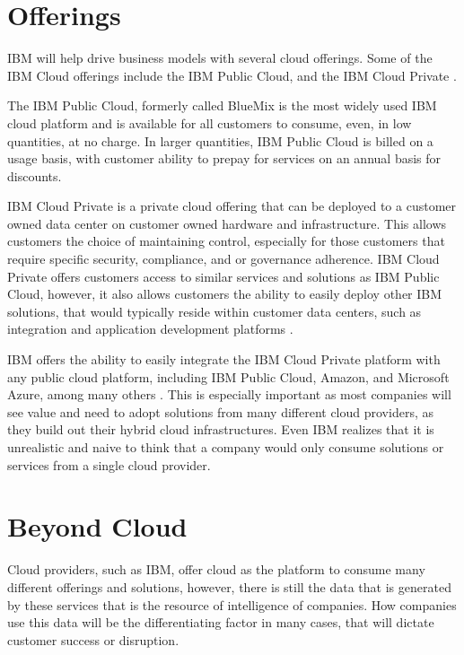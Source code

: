 \documentclass{acm_proc_article-sp}
\begin{document}
\section{Offerings}

IBM will help drive business models with several cloud offerings.  Some of the IBM Cloud offerings include the IBM Public Cloud, and the IBM Cloud Private \cite{hid-sp18-525-winning}.  

The IBM Public Cloud, formerly called BlueMix is the most widely used IBM cloud platform and is available for all customers to consume, even, in low quantities, at no charge. In larger quantities, IBM Public Cloud is billed on a usage basis, with customer ability to prepay for services on an annual basis for discounts.  

IBM Cloud Private is a private cloud offering that can be deployed to a customer owned data center on customer owned hardware and infrastructure.  This allows customers the choice of maintaining control, especially for those customers that require specific security, compliance, and or governance adherence.  IBM Cloud Private offers customers access to similar services and solutions as IBM Public Cloud, however, it also allows customers the ability to easily deploy other IBM solutions, that would typically reside within customer data centers, such as integration and application development platforms \cite{hid-sp18-525-winning}.  

IBM offers the ability to easily integrate the IBM Cloud Private platform with any public cloud platform, including IBM Public Cloud, Amazon, and Microsoft Azure, among many others \cite{hid-sp18-525-winning}.  This is especially important as most companies will see value and need to adopt solutions from many different cloud providers, as they build out their hybrid cloud infrastructures.  Even IBM realizes that it is unrealistic and naive to think that a company would only consume solutions or services from a single cloud provider.    

\section{Beyond Cloud}

Cloud providers, such as IBM, offer cloud as the platform to consume many different offerings and solutions, however, there is still the data that is generated by these services that is the resource of intelligence of companies.  How companies use this data will be the differentiating factor in many cases, that will dictate customer success or disruption.
\end{document}
